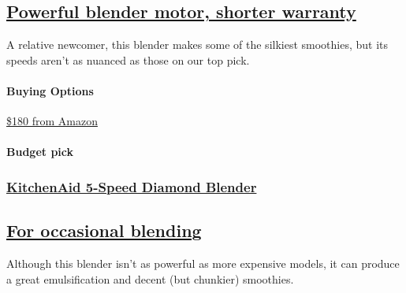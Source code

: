 \hypertarget{powerful-blender-motor-shorter-warranty-1}{%
\subsection{\texorpdfstring{\href{https://www.nytimes3xbfgragh.onion/wirecutter/out/link/8947/25620/4/109196?merchant=Amazon}{Powerful
blender motor, shorter
warranty}}{Powerful blender motor, shorter warranty}}\label{powerful-blender-motor-shorter-warranty-1}}

A relative newcomer, this blender makes some of the silkiest smoothies,
but its speeds aren't as nuanced as those on our top pick.

\hypertarget{buying-options-6}{%
\paragraph{Buying Options}\label{buying-options-6}}

\href{https://www.nytimes3xbfgragh.onion/wirecutter/out/link/8947/25620/4/109196?merchant=Amazon}{\$180
from Amazon}

\hypertarget{budget-pick-1}{%
\paragraph{Budget pick}\label{budget-pick-1}}

\href{https://www.nytimes3xbfgragh.onion/wirecutter/out/link/35968/159119/4/109197?merchant=Bed\%20Bath\%20\%26\%20Beyond}{}

\hypertarget{kitchenaid-5-speed-diamond-blender-1}{%
\subsubsection{\texorpdfstring{\href{https://www.nytimes3xbfgragh.onion/wirecutter/out/link/35968/159119/4/109197?merchant=Bed\%20Bath\%20\%26\%20Beyond}{KitchenAid
5-Speed Diamond
Blender}}{KitchenAid 5-Speed Diamond Blender}}\label{kitchenaid-5-speed-diamond-blender-1}}

\hypertarget{for-occasional-blending-1}{%
\subsection{\texorpdfstring{\href{https://www.nytimes3xbfgragh.onion/wirecutter/out/link/35968/159119/4/109197?merchant=Bed\%20Bath\%20\%26\%20Beyond}{For
occasional
blending}}{For occasional blending}}\label{for-occasional-blending-1}}

Although this blender isn't as powerful as more expensive models, it can
produce a great emulsification and decent (but chunkier) smoothies.

